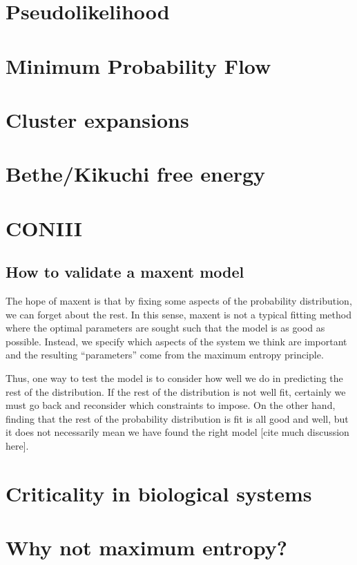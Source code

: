 \documentclass[11pt]{amsart}
\begin{document}
\section{Pseudolikelihood}

\section{Minimum Probability Flow}

\section{Cluster expansions}

\section{Bethe/Kikuchi free energy}

\section{CONIII}

\subsection{How to validate a maxent model}
The hope of maxent is that by fixing some aspects of the probability distribution, we can forget about the rest. In this sense, maxent is not a typical fitting method where the optimal parameters are sought such that the model is as good as possible. Instead, we specify which aspects of the system we think are important and the resulting ``parameters'' come from the maximum entropy principle.

Thus, one way to test the model is to consider how well we do in predicting the rest of the distribution. If the rest of the distribution is not well fit, certainly we must go back and reconsider which constraints to impose. On the other hand, finding that the rest of the probability distribution is fit is all good and well, but it does not necessarily mean we have found the right model [cite much discussion here].

\section{Criticality in biological systems}

\section{Why not maximum entropy?}
\end{document}
